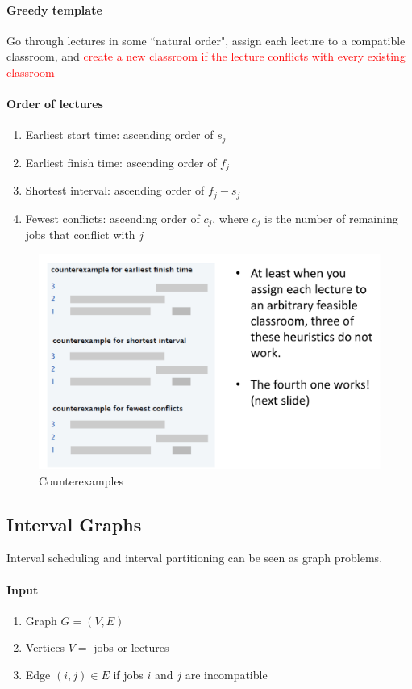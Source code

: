 \documentclass[11pt]{article}
\begin{document}
\paragraph{Greedy template}
Go through lectures in some ``natural order", assign each lecture to a compatible classroom, and \textcolor{red}{create a new classroom if the lecture conflicts with every existing classroom}

\paragraph{Order of lectures}
\begin{enumerate}
	\item Earliest start time: ascending order of $s_j$
	\item Earliest finish time: ascending order of $f_j$
	\item Shortest interval: ascending order of $f_j - s_j$
	\item Fewest conflicts: ascending order of $c_j$, where $c_j$ is the number of remaining jobs that conflict with $j$
\end{enumerate}


\begin{figure}[h]
	\centering
	\includegraphics[scale=0.6]{p12}
	\caption{Counterexamples}
\end{figure}

\subsection{Interval Graphs}
Interval scheduling and interval partitioning can be seen as graph problems.
\paragraph{Input}
\begin{enumerate}
	\item Graph $G = (V, E)$
	\item Vertices $V = $ jobs or lectures
	\item Edge $(i, j) \in E$ if jobs $i$ and $j$ are incompatible
\end{enumerate}
\end{document}
